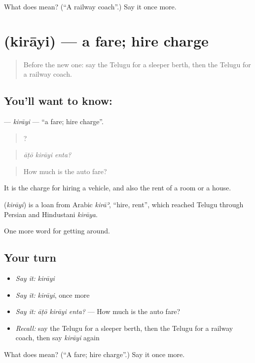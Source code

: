 \begin{tcolorbox}[breakable,colback=teal!4,colframe=teal!35!black,title={Before you move on}]
What does  mean? (\textquotedblleft{}A railway coach\textquotedblright{}.) Say it once more.
\end{tcolorbox}
\section[\texorpdfstring{\te{కిరాయి} (kirāyi)}{కిరాయి (kirāyi)}]{ (kirāyi) — a fare; hire charge}

\label{lesson:TE-C439-kirayi}



\begin{quote}
Before the new one: say the Telugu for a sleeper berth, then the Telugu for a railway coach.
\end{quote}

\subsection*{You'll want to know: }
\textbf{} — \emph{kirāyi} — \textquotedblleft{}a fare; hire charge\textquotedblright{}.

\begin{quote}
  ?
\end{quote}

\begin{quote}
\emph{āṭō kirāyi enta?}
\end{quote}

\begin{quote}
How much is the auto fare?
\end{quote}

It is the charge for hiring a vehicle, and also the rent of a room or a house.

\begin{cousinweb}
\textbf{} (\emph{kirāyi}) is a loan from Arabic \emph{kirāʾ}, \textquotedblleft{}hire, rent\textquotedblright{}, which reached Telugu through Persian and Hindustani \emph{kirāya}.
\end{cousinweb}

\begin{grammarlens}[title={What you've built}]
One more word for getting around.
\end{grammarlens}

\subsection*{Your turn}
\begin{itemize}
\raggedright
  \item \emph{Say it:} \emph{kirāyi}
  \item \emph{Say it:} \emph{kirāyi}, once more
  \item \emph{Say it:} \emph{āṭō kirāyi enta?} — How much is the auto fare?
  \item \emph{Recall:} say the Telugu for a sleeper berth, then the Telugu for a railway coach, then say \emph{kirāyi} again
\end{itemize}

\begin{tcolorbox}[breakable,colback=teal!4,colframe=teal!35!black,title={Before you move on}]
What does  mean? (\textquotedblleft{}A fare; hire charge\textquotedblright{}.) Say it once more.
\end{tcolorbox}
